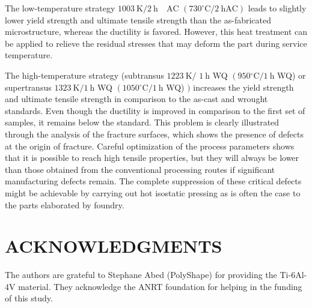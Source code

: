 \documentclass[10pt]{article}
\begin{document}
The low-temperature strategy $1003 \mathrm{~K} / 2 \mathrm{~h} \quad \mathrm{AC}$ $\left(730^{\circ} \mathrm{C} / 2 \mathrm{~h} \mathrm{AC}\right)$ leads to slightly lower yield strength and ultimate tensile strength than the as-fabricated microstructure, whereas the ductility is favored. However, this heat treatment can be applied to relieve the residual stresses that may deform the part during service temperature.

The high-temperature strategy (subtransus $1223 \mathrm{~K} /$ $1 \mathrm{~h}$ WQ $\left(950{ }^{\circ} \mathrm{C} / 1 \mathrm{~h}\right.$ WQ) or supertransus $1323 \mathrm{~K} / 1 \mathrm{~h}$ WQ $\left(1050{ }^{\circ} \mathrm{C} / 1 \mathrm{~h}\right.$ WQ) $)$ increases the yield strength and ultimate tensile strength in comparison to the as-cast and wrought standards. Even though the ductility is improved in comparison to the first set of samples, it remains below the standard. This problem is clearly illustrated through the analysis of the fracture surfaces, which shows the presence of defects at the origin of fracture. Careful optimization of the process parameters shows that it is possible to reach high tensile properties, but they will always be lower than those obtained from the conventional processing routes if significant manufacturing defects remain. The complete suppression of these critical defects might be achievable by carrying out hot isostatic pressing as is often the case to the parts elaborated by foundry.

\section*{ACKNOWLEDGMENTS}
The authors are grateful to Stephane Abed (PolyShape) for providing the Ti-6Al-4V material. They acknowledge the ANRT foundation for helping in the funding of this study.
\end{document}
